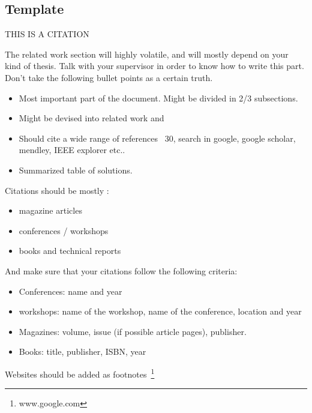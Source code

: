 
\subsection{Template} %
\label{sub:Template}


THIS IS A CITATION\cite{Braem2013a}
  
The related work section will highly volatile, and will mostly depend on your kind of thesis. Talk with your supervisor in order to know how to write this part. Don't take the following bullet points as a certain truth.

\begin{itemize}
  \item Most important part of the document. Might be divided in 2/3 subsections.
  \item Might be devised into related work and 
  \item Should cite a wide range of references ~30, search in google, google scholar, mendley, IEEE explorer etc..
  \item Summarized table of solutions.
\end{itemize}

Citations should be mostly :
\begin{itemize}
  \item magazine articles
  \item conferences / workshops
  \item books and technical reports
\end{itemize}
And make sure that your citations follow the following criteria:
\begin{itemize}
  \item Conferences: name and year
  \item workshops: name of the workshop, name of the conference, location and year
  \item Magazines: volume, issue (if possible article pages), publisher.
  \item Books: title, publisher, ISBN, year
\end{itemize}
Websites should be added as footnotes~\footnote{www.google.com}

